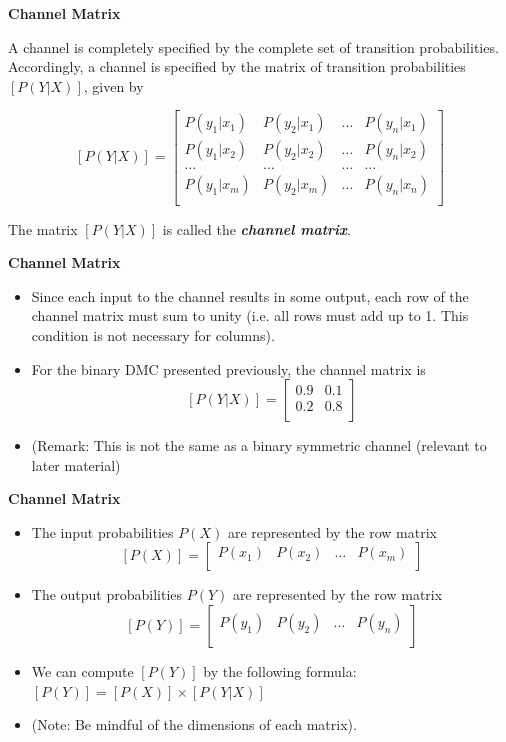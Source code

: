 \documentclass[a4]{beamer}
\begin{document}
\noindent \textbf{Channel Matrix}

A channel is completely specified by the complete set of transition probabilities. Accordingly, a
channel is specified by the matrix of transition probabilities $[P(Y|X)]$, given by

\[  [P(Y|X)]  = \left[ \begin{array}{cccc}
P(y_1|x_1) & P(y_2|x_1) & \ldots & P(y_n|x_1) \\
P(y_1|x_2) & P(y_2|x_2) & \ldots & P(y_n|x_2) \\
\ldots & \ldots & \ldots & \ldots \\
P(y_1|x_m) & P(y_2|x_m) & \ldots & P(y_n|x_n) \\
\end{array} \right] \]


The matrix $[P(Y|X)]$ is called the \textbf{\emph{channel matrix}}.
 


\noindent \textbf{Channel Matrix}
\begin{itemize}
\item Since each input to the channel results in some
output, each row of the channel matrix must sum to unity (i.e. all rows must add up to 1. This condition is not necessary for columns).
\item For the binary DMC presented previously, the channel matrix is
\[  [P(Y|X)]  = \left[ \begin{array}{cc}
0.9 & 0.1  \\
0.2 & 0.8 \\
\end{array} \right] \]
\item (Remark: This is not the same as a binary symmetric channel (relevant to later material)
\end{itemize}




\noindent \textbf{Channel Matrix}
\begin{itemize}
\item The input probabilities $P(X)$ are represented by the row matrix
\[  [P(X)]  = \left[ \begin{array}{cccc}
P(x_1) & P(x_2) & \ldots & P(x_m) \\
\end{array} \right] \]
\item The output probabilities $P(Y)$ are represented by the row matrix
\[  [P(Y)]  = \left[ \begin{array}{cccc}
P(y_1) & P(y_2) & \ldots & P(y_n) \\
\end{array} \right] \]
\item We can compute $[P(Y)] $ by the following formula: $[P(Y)]  = [P(X)]\times [P(Y|X)]$
\item (Note: Be mindful of the dimensions of each matrix).
\end{itemize}
\end{document}
